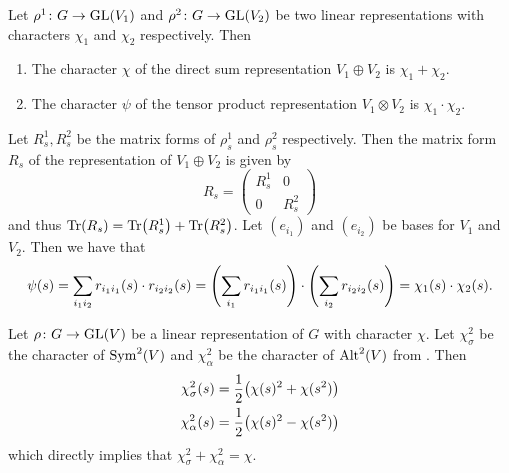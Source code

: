 \documentclass[letterpaper, 11pt, oneside]{book}
\begin{document}
\begin{prop}\label{prop:direct_sum_tensor_characters}
  Let $\rho^{1}\colon G \to \operatorname{GL}(V_{1})$ and $\rho^{2}\colon G \to \operatorname{GL}(V_{2})$ be two linear representations with characters $\chi_{1}$ and $\chi_{2}$ respectively.
  Then
  \begin{enumerate}
  \item The character $\chi$ of the direct sum representation $V_{1} \oplus V_{2}$ is $\chi_{1} + \chi_{2}$.
  \item The character $\psi$ of the tensor product representation $V_{1} \otimes V_{2}$ is $\chi_{1} \cdot \chi_{2}$.
  \end{enumerate}
\end{prop}
\begin{pf}
  Let $R_{s}^{1}, R_{s}^{2}$ be the matrix forms of $\rho^{1}_{s}$ and $\rho_{s}^{2}$ respectively.
  Then the matrix form $R_{s}$ of the representation of $V_{1} \oplus V_{2}$ is given by
  \[
    R_{s} = \begin{pmatrix} R_{s}^{1} & 0 \\  0& R_{s}^{2} \end{pmatrix}
  \]
  and thus $\Tr(R_{s}) = \Tr(R_{s}^{1}) + \Tr(R_{s}^{2})$.
  Let $(e_{i_{1}})$ and $(e_{i_{2}})$ be bases for $V_{1}$ and $V_{2}$.
  Then we have that
  \[
    \psi(s) = \sum_{i_{1} i_{2}} r_{i_{1}i_{1}}(s) \cdot r_{i_{2}i_{2}}(s) = \pqty{\sum_{i_{1}} r_{i_{1}i_{1}}(s)} \cdot \pqty{\sum_{i_{2}} r_{i_{2}i_{2}}(s)} = \chi_{1}(s) \cdot \chi_{2}(s).
  \]
\end{pf}

\begin{prop}\label{prop:sym_alt_characters}
  Let $\rho\colon G \to \operatorname{GL}(V)$ be a linear representation of $G$ with character $\chi$.
  Let $\chi_{\sigma}^{2}$ be the character of $\operatorname{Sym}^{2}(V)$ and $\chi_{\alpha}^{2}$ be the character of $\operatorname{Alt}^{2}(V)$ from .
  Then
  \begin{align*}
    \chi_{\sigma}^{2}(s) &= \frac{1}{2}\pqty{\chi(s)^{2} + \chi(s^{2})} \\
    \chi_{\alpha}^{2}(s) &= \frac{1}{2}\pqty{\chi(s)^{2} - \chi(s^{2})}
  \end{align*}
  which directly implies that $\chi_{\sigma}^{2} + \chi_{\alpha}^{2} = \chi$.
\end{prop}
\end{document}
